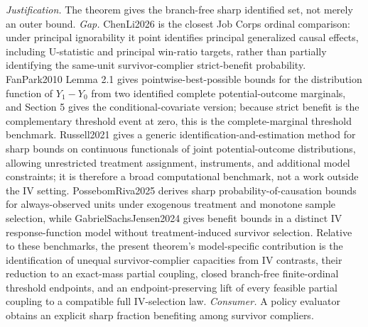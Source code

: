 \documentclass{article}
\begin{document}
\par\smallskip\noindent \textit{Justification.} The theorem gives the branch-free sharp identified set, not merely an outer bound. \textit{Gap.} ChenLi2026 is the closest Job Corps ordinal comparison: under principal ignorability it point identifies principal generalized causal effects, including U-statistic and principal win-ratio targets, rather than partially identifying the same-unit survivor-complier strict-benefit probability. FanPark2010 Lemma 2.1 gives pointwise-best-possible bounds for the distribution function of \(Y_1-Y_0\) from two identified complete potential-outcome marginals, and Section 5 gives the conditional-covariate version; because strict benefit is the complementary threshold event at zero, this is the complete-marginal threshold benchmark. Russell2021 gives a generic identification-and-estimation method for sharp bounds on continuous functionals of joint potential-outcome distributions, allowing unrestricted treatment assignment, instruments, and additional model constraints; it is therefore a broad computational benchmark, not a work outside the IV setting. PossebomRiva2025 derives sharp probability-of-causation bounds for always-observed units under exogenous treatment and monotone sample selection, while GabrielSachsJensen2024 gives benefit bounds in a distinct IV response-function model without treatment-induced survivor selection. Relative to these benchmarks, the present theorem’s model-specific contribution is the identification of unequal survivor-complier capacities from IV contrasts, their reduction to an exact-mass partial coupling, closed branch-free finite-ordinal threshold endpoints, and an endpoint-preserving lift of every feasible partial coupling to a compatible full IV-selection law. \textit{Consumer.} A policy evaluator obtains an explicit sharp fraction benefiting among survivor compliers.
\end{document}
